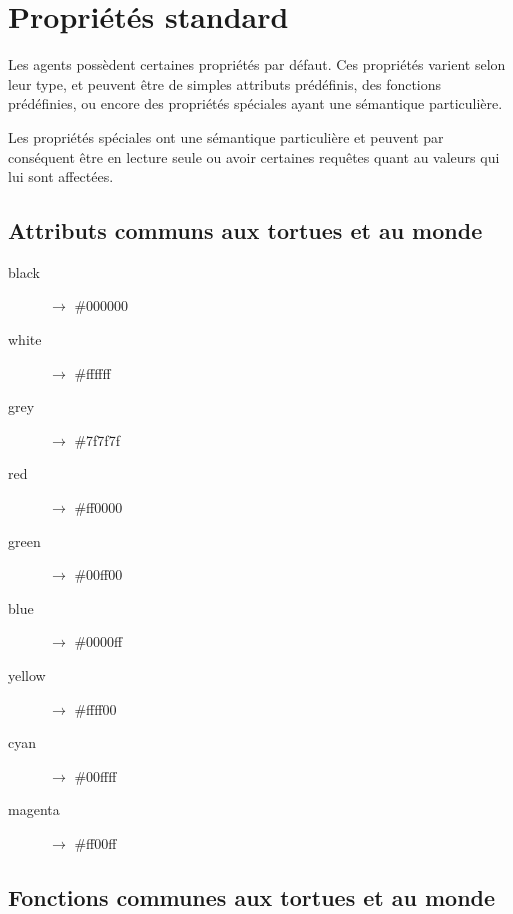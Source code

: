 \section{Propriétés standard}

Les agents possèdent certaines propriétés par défaut. Ces propriétés varient selon leur type, et peuvent être de simples attributs prédéfinis, des fonctions prédéfinies, ou encore des propriétés spéciales ayant une sémantique particulière.

Les propriétés spéciales ont une sémantique particulière et peuvent par conséquent être en lecture seule ou avoir certaines requêtes quant au valeurs qui lui sont affectées.

\subsection{Attributs communs aux tortues et au monde}

\begin{description}
	\item[black] $\rightarrow$ \#000000
	\item[white] $\rightarrow$ \#ffffff
	\item[grey] $\rightarrow$ \#7f7f7f
	\item[red] $\rightarrow$ \#ff0000
	\item[green] $\rightarrow$ \#00ff00
	\item[blue] $\rightarrow$ \#0000ff
	\item[yellow] $\rightarrow$ \#ffff00
	\item[cyan] $\rightarrow$ \#00ffff
	\item[magenta] $\rightarrow$ \#ff00ff
\end{description}

\subsection{Fonctions communes aux tortues et au monde}

